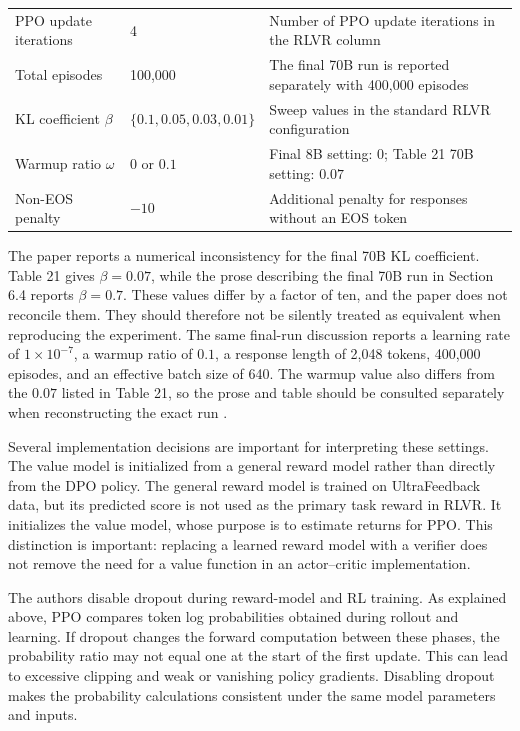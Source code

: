\begin{table}[htbp]
\begin{tabularx}{\textwidth}{l l X}
        PPO update iterations
        & 4
        & Number of PPO update iterations in the RLVR column\\
        Total episodes
        & 100,000
        & The final 70B run is reported separately with 400,000 episodes\\
        KL coefficient \(\beta\)
        & \(\{0.1,0.05,0.03,0.01\}\)
        & Sweep values in the standard RLVR configuration\\
        Warmup ratio \(\omega\)
        & \(0\) or \(0.1\)
        & Final 8B setting: \(0\); Table 21 70B setting: \(0.07\)\\
        Non-EOS penalty
        & \(-10\)
        & Additional penalty for responses without an EOS token\\
        \bottomrule
    \end{tabularx}
\end{table}

The paper reports a numerical inconsistency for the final 70B KL coefficient.
Table 21 gives \(\beta=0.07\), while the prose describing the final 70B
run in Section 6.4 reports \(\beta=0.7\). These values differ by a factor
of ten, and the paper does not reconcile them. They should therefore not be
silently treated as equivalent when reproducing the experiment. The same
final-run discussion reports a learning rate of \(1\times10^{-7}\), a
warmup ratio of \(0.1\), a response length of 2,048 tokens, 400,000
episodes, and an effective batch size of 640. The warmup value also differs
from the \(0.07\) listed in Table 21, so the prose and table should be
consulted separately when reconstructing the exact run
\parencite{lambert2025tulu3}.

Several implementation decisions are important for interpreting these
settings. The value model is initialized from a general reward model rather
than directly from the DPO policy. The general reward model is trained on
UltraFeedback data, but its predicted score is not used as the primary task
reward in RLVR. It initializes the value model, whose purpose is to estimate
returns for PPO. This distinction is important: replacing a learned reward
model with a verifier does not remove the need for a value function in an
actor--critic implementation.

The authors disable dropout during reward-model and RL training. As
explained above, PPO compares token log probabilities obtained during
rollout and learning. If dropout changes the forward computation between
these phases, the probability ratio may not equal one at the start of the
first update. This can lead to excessive clipping and weak or vanishing
policy gradients. Disabling dropout makes the probability calculations
consistent under the same model parameters and inputs.

